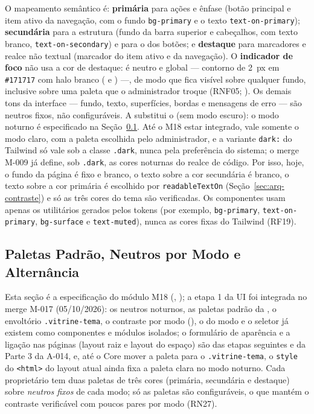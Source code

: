 O mapeamento semântico é: \textbf{primária} para ações e ênfase (botão principal e item ativo da navegação, com o fundo \texttt{bg-primary} e o texto \texttt{text-on-primary}); \textbf{secundária} para a estrutura (fundo da barra superior e cabeçalhos, com texto branco, \texttt{text-on-secondary}) e para o  dos botões; e \textbf{destaque} para marcadores e realce não textual (marcador do item ativo e  da navegação). O \textbf{indicador de foco} não usa a cor de destaque: é neutro e global --- contorno de 2~px em \texttt{\#171717} com halo branco ( e ) ---, de modo que fica visível sobre qualquer fundo, inclusive sobre uma paleta que o administrador troque (RNF05; ). Os demais tons da interface --- fundo, texto, superfícies, bordas e mensagens de erro --- são neutros fixos, não configuráveis. A  substitui o  (sem modo escuro): o modo noturno é especificado na Seção~\ref{sec:arq-tema-padrao}. Até o M18 estar integrado, vale somente o modo claro, com a paleta escolhida pelo administrador, e a variante \texttt{dark:} do Tailwind só vale sob a classe \texttt{.dark}, nunca pela preferência do sistema; o merge M-009 já define, sob \texttt{.dark}, as cores noturnas do realce de código. Por isso, hoje, o fundo da página é fixo e branco, o texto sobre a cor secundária é branco, o texto sobre a cor primária é escolhido por \texttt{readableTextOn} (Seção~\ref{sec:arq-contraste}) e só as três cores do tema são verificadas. Os componentes usam apenas os utilitários gerados pelos tokens (por exemplo, \texttt{bg-primary}, \texttt{text-on-primary}, \texttt{bg-surface} e \texttt{text-muted}), nunca as cores fixas do Tailwind (RF19).

\subsection{Paletas Padrão, Neutros por Modo e Alternância}\label{sec:arq-tema-padrao}

Esta seção é a especificação do módulo M18 (, ); a etapa 1 da UI foi integrada no merge M-017 (05/10/2026): os neutros noturnos, as paletas padrão da , o envoltório \texttt{.vitrine-tema}, o contraste por modo (), o  do modo e o seletor já existem como componentes e módulos isolados; o formulário de aparência e a ligação nas páginas (layout raiz e layout do espaço) são das etapas seguintes e da Parte 3 da A-014, e, até o Core mover a paleta para o \texttt{.vitrine-tema}, o \texttt{style} do \texttt{<html>} do layout atual ainda fixa a paleta clara no modo noturno. Cada proprietário tem duas paletas de três cores (primária, secundária e destaque) sobre \emph{neutros fixos} de cada modo; só as paletas são configuráveis, o que mantém o contraste verificável com poucos pares por modo (RN27).

